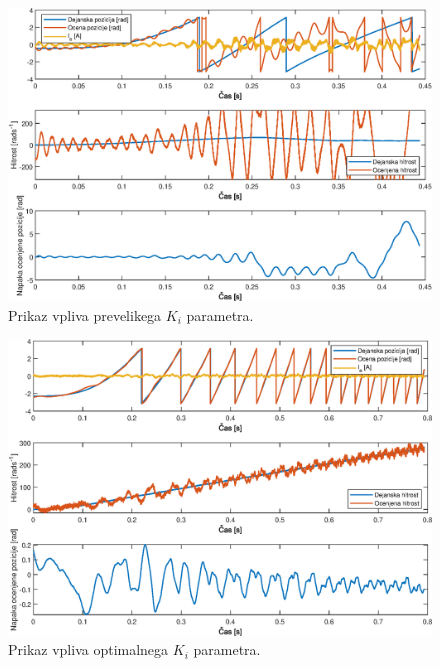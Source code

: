 \documentclass[a4paper,twoside,openright,12pt,slovene]{book}
\begin{document}
\begin{figure}[!htbp]
    \centering
    \includegraphics[width=1\columnwidth]{Slike/PItuning_Ki_unstableHigh.eps}
    \caption{\label{PItuning_Ki_unstableHigh} Prikaz vpliva prevelikega $K_i$ parametra. }
\end{figure}

\begin{figure}[!htbp]
    \centering
    \includegraphics[width=1\columnwidth]{Slike/PItuning_Ki_stable.eps}
    \caption{\label{PItuning_Ki_stable} Prikaz vpliva optimalnega $K_i$ parametra. }
\end{figure}
\end{document}
